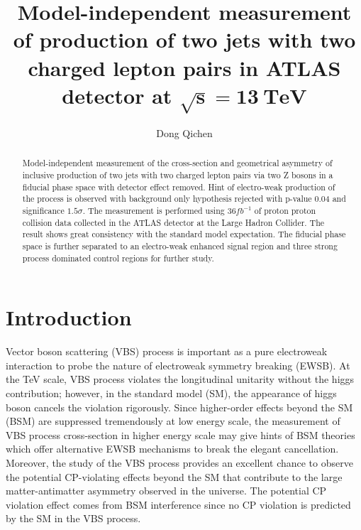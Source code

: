 \documentclass[12pt]{article}
\begin{document}
    \title{\noindent\textbf{Model-independent measurement of production of two jets with two charged lepton pairs in ATLAS detector at} $\mathbf{\sqrt{s} = 13\ {TeV}}$}
    \author{Dong Qichen}
    \maketitle

    \begin{abstract}
        \noindent Model-independent measurement of the cross-section and geometrical asymmetry of 
        inclusive production of two jets with two charged lepton pairs via two Z bosons in a fiducial 
        phase space with detector effect removed. Hint of electro-weak production of the process 
        is observed with background only hypothesis rejected with p-value 0.04 and significance $1.5\sigma$. 
        The measurement is 
        performed using $36fb^{-1}$ of proton proton collision data collected in the ATLAS detector 
        at the Large Hadron Collider. The result shows great consistency 
        with the standard model expectation. The fiducial phase space is further separated to an 
        electro-weak enhanced signal region and three strong process dominated control regions for further
        study.
    \end{abstract}
    \newpage

    \section{Introduction}
        \par Vector boson scattering (VBS) process is important as a pure electroweak interaction to 
        probe the nature of electroweak symmetry breaking\cite{dawson1999introduction} (EWSB). At the 
        TeV scale, VBS process violates the longitudinal unitarity without the higgs contribution; 
        however, in the standard model\cite{ALTARELLI:2005zv} (SM), the appearance of higgs boson cancels 
        the violation rigorously. Since higher-order effects beyond the SM (BSM) are suppressed tremendously 
        at low energy scale, the measurement of VBS process cross-section in higher energy scale may give hints of BSM theories which 
        offer alternative EWSB mechanisms to break the elegant cancellation. Moreover, 
        the study of the VBS process provides an excellent chance to observe the potential CP-violating effects\cite{peccei1995cp} beyond the SM 
        that contribute to the large matter-antimatter asymmetry observed in the universe. The potential CP violation effect comes from BSM interference
        since no CP violation is predicted by the SM in the VBS process.
\end{document}
